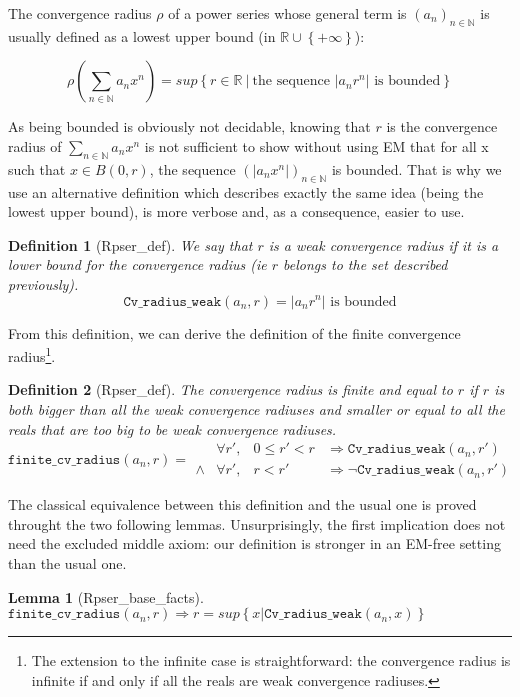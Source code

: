 \documentclass[submission,copyright]{eptcs}
\newcommand{\N}{\mathbb{N}}
\newcommand{\R}{\mathbb{R}}
\newcommand{\cvrw}{\texttt{Cv\_radius\_weak}}
\newcommand{\fcvr}{\texttt{finite\_cv\_radius}}
\newtheorem{definition}{Definition}
\newtheorem{lemma}{Lemma}
\begin{document}
The convergence radius $\rho$ of a power series whose general term is
$(a_n)_{n \in \N}$ is usually defined as a lowest upper bound (in
$\R \cup \left\lbrace +\infty \right\rbrace$):

 $$\rho(\sum_{n \in \N} a_n x^n) = sup \left\lbrace r \in \R ~|~
   \text{the sequence } \left|a_n r^n\right| \text{ is bounded}
   \right\rbrace$$

As being bounded is obviously not decidable, knowing that $r$ is the
convergence radius of $\sum_{n \in \N} a_n x^n$ is not sufficient to
show without using EM that for all x such that $x \in B(0,r)$, the
sequence $(\left| a_n x^n \right|)_{n \in \N}$ is bounded. That is why
we use an alternative definition which describes exactly the same
idea (being the lowest upper bound), is more verbose and, as a
consequence, easier to use.

\begin{definition}[Rpser\_def] We say that $r$ is a weak convergence
radius if it is a lower bound for the convergence radius (ie $r$ belongs
to the set described previously).
$$\cvrw{}(a_n,r) = \left| a_n r^n \right| \text{ is bounded}$$
\end{definition}

From this definition, we can derive the definition of the finite
convergence radius\footnote{The extension to the infinite case is
straightforward: the convergence radius is infinite if and only if
all the reals are weak convergence radiuses.}.

\begin{definition}[Rpser\_def] The convergence radius is finite and
equal to $r$ if $r$ is both bigger than all the weak convergence radiuses 
and smaller or equal to all the reals that are too big to be weak
convergence radiuses.
$$\fcvr{}(a_n,r) =
\begin{array}{clcl}
        & \forall r', & 0 \le r' < r & \Rightarrow \cvrw{}(a_n,r') \\
 \wedge & \forall r', & r < r' & \Rightarrow \neg \cvrw{}(a_n,r')
\end{array}$$
\end{definition}

The classical equivalence between this definition and the usual one is proved
throught the two following lemmas. Unsurprisingly, the first implication does
not need the excluded middle axiom: our definition is stronger in an EM-free
setting than the usual one.

\begin{lemma}[Rpser\_base\_facts] $\fcvr{}(a_n,r) \Rightarrow r = sup \left\lbrace x |
\cvrw{}(a_n, x) \right\rbrace$ \end{lemma}
\end{document}
